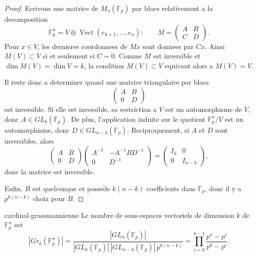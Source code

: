 \begin{proof}
    Ecrivons une matrice de $M_n(\mathbb{F}_p)$ par blocs relativement a la
    decomposition
    \[
        \mathbb{F}_p^n=V\oplus \operatorname{Vect}(e_{k+1},\dots,e_n):
        \qquad
        M=
        \begin{pmatrix}
            A & B \\
            C & D
        \end{pmatrix}.
    \]
    Pour $x\in V$, les dernieres coordonnees de $Mx$ sont donnees par $Cx$.
    Ainsi $M(V)\subset V$ si et seulement si $C=0$. Comme $M$ est inversible et
    $\dim M(V)=\dim V=k$, la condition $M(V)\subset V$ equivaut alors a
    $M(V)=V$.

    Il reste donc a determiner quand une matrice triangulaire par blocs
    \[
        \begin{pmatrix}
            A & B \\
            0 & D
        \end{pmatrix}
    \]
    est inversible. Si elle est inversible, sa restriction a $V$ est un
    automorphisme de $V$, donc $A\in GL_k(\mathbb{F}_p)$. De plus, l'application
    induite sur le quotient $\mathbb{F}_p^n/V$ est un automorphisme, donc
    $D\in GL_{n-k}(\mathbb{F}_p)$. Reciproquement, si $A$ et $D$ sont
    inversibles, alors
    \[
        \begin{pmatrix}
            A & B \\
            0 & D
        \end{pmatrix}
        \begin{pmatrix}
            A^{-1} & -A^{-1}BD^{-1} \\
            0 & D^{-1}
        \end{pmatrix}
        =
        \begin{pmatrix}
            I_k & 0 \\
            0 & I_{n-k}
        \end{pmatrix},
    \]
    donc la matrice est inversible.

    Enfin, $B$ est quelconque et possede $k(n-k)$ coefficients dans
    $\mathbb{F}_p$, donc il y a $p^{k(n-k)}$ choix pour $B$.
\end{proof}

\begin{theoreme}{}{cardinal-grassmannienne}
    Le nombre de sous-espaces vectoriels de dimension $k$ de $\mathbb{F}_p^n$
    est
    \[
        |Gr_k(\mathbb{F}_p^n)|
        =
        \frac{|GL_n(\mathbb{F}_p)|}
        {|GL_k(\mathbb{F}_p)|\,|GL_{n-k}(\mathbb{F}_p)|\,p^{k(n-k)}}
        =
        \prod_{i=0}^{k-1}\frac{p^n-p^i}{p^k-p^i}.
    \]
\end{theoreme}

